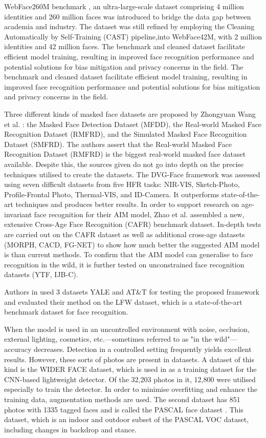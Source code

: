 WebFace260M benchmark \cite{zhu_webface260m_2023}, an ultra-large-scale dataset comprising 4 million identities and 260 million faces was introduced to bridge the data gap between academia and industry. The dataset was still refined by employing the Cleaning Automatically by Self-Training (CAST) pipeline,into WebFace42M, with 2 million identities and 42 million faces. The benchmark and cleaned dataset facilitate efficient model training, resulting in improved face recognition performance and potential solutions for bias mitigation and privacy concerns in the field. The benchmark and cleaned dataset facilitate efficient model training, resulting in improved face recognition performance and potential solutions for bias mitigation and privacy concerns in the field.

Three different kinds of masked face datasets are proposed by Zhongyuan Wang et al. \cite{wang_masked_2023}: the Masked Face Detection Dataset (MFDD), the Real-world Masked Face Recognition Dataset (RMFRD), and the Simulated Masked Face Recognition Dataset (SMFRD). The authors assert that the Real-world Masked Face Recognition Dataset (RMFRD) is the biggest real-world masked face dataset available. Despite this, the sources given do not go into depth on the precise techniques utilised to create the datasets. The DVG-Face framework \cite{fu_dvg-face_2022} was assessed using seven difficult datasets from five HFR tasks: NIR-VIS, Sketch-Photo, Profile-Frontal Photo, Thermal-VIS, and ID-Camera. It outperforms state-of-the-art techniques and produces better results. In order to support research on age-invariant face recognition for their AIM model, Zhao et al. \cite{zhao_towards_2022} assembled a new, extensive Cross-Age Face Recognition (CAFR) benchmark dataset. In-depth tests are carried out on the CAFR dataset as well as additional cross-age datasets (MORPH, CACD, FG-NET) to show how much better the suggested AIM model is than current methods. To confirm that the AIM model can generalise to face recognition in the wild, it is further tested on unconstrained face recognition datasets (YTF, IJB-C).

Authors in \cite{abuzneid_enhanced_2018} used 3 datasets YALE and AT\&T for testing the proposed framework and evaluated their method on the LFW dataset, which is a state-of-the-art benchmark dataset for face recognition.

When the model is used in an uncontrolled environment with noise, occlusion, external lighting, cosmetics, etc.—sometimes referred to as "in the wild"—accuracy decreases. Detection in a controlled setting frequently yields excellent results. However, these sorts of photos are present in datasets. A dataset of this kind is the WIDER FACE dataset, which is used in \cite{putro_high_2021} as a training dataset for the CNN-based lightweight detector. Of the 32,203 photos in it, 12,800 were utilised especially to train the detector. In order to minimise overfitting and enhance the training data, augmentation methods are used. The second dataset has 851 photos with 1335 tagged faces and is called the PASCAL face dataset \cite{putro_high_2021}. This dataset, which is an indoor and outdoor subset of the PASCAL VOC dataset, including changes in backdrop and stance.

